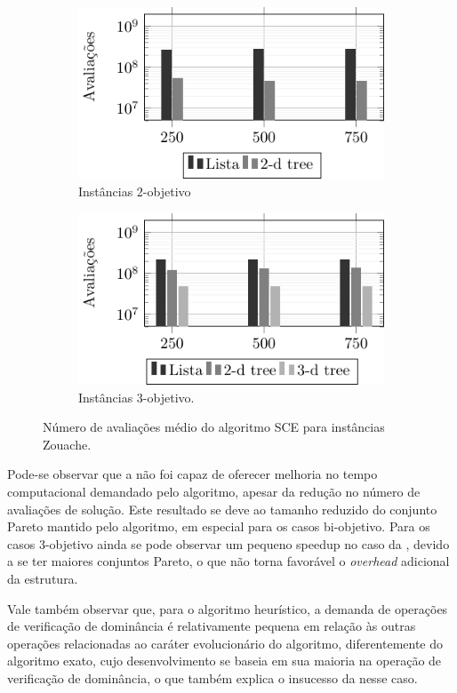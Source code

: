 \begin{figure}
\centering
\begin{subfigure}{.5\textwidth}
  \centering
  \includegraphics[scale=1.1]{tab/sce/cmpres2}
  \caption{Instâncias 2-objetivo}
  \label{fig:cmpsce2}
\end{subfigure}%
\begin{subfigure}{.5\textwidth}
  \centering
  \includegraphics[scale=1.1]{tab/sce/cmpres3}
  \caption{Instâncias 3-objetivo.}
  \label{fig:cmpsce3}
\end{subfigure}
\caption{Número de avaliações médio do algoritmo SCE para instâncias Zouache.}
\label{fig:cmpsce}
\end{figure}

Pode-se observar que a  não foi capaz de oferecer melhoria no tempo computacional
demandado pelo algoritmo, apesar da redução no número de avaliações de solução.
Este resultado se deve ao tamanho reduzido do conjunto Pareto mantido pelo algoritmo,
em especial para os casos bi-objetivo.
Para os casos 3-objetivo ainda se pode observar um pequeno speedup no
caso da , devido a se ter maiores conjuntos Pareto,
o que não torna favorável o \emph{overhead} adicional da estrutura.


Vale também observar que, para o algoritmo heurístico,
a demanda de operações de verificação
de dominância é relativamente pequena em relação às outras operações relacionadas
ao caráter evolucionário do algoritmo, diferentemente do algoritmo exato,
cujo desenvolvimento se baseia em sua maioria na operação de verificação de dominância,
o que também explica o insucesso da \kdtree{} nesse caso.
